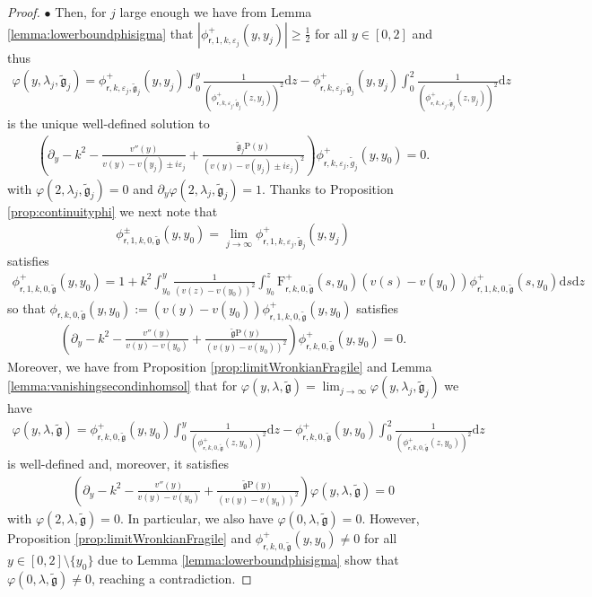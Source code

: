 \documentclass[11pt,reqno]{amsproc}
\newcommand{\bullsubpar}[1]{\vspace{.5em} $\bullet$ \normalfont {\bfseries #1.}}
\theoremstyle{definition}
\numberwithin{equation}{section}
\newcommand{\sr}{{\mathsf{r}}}
\renewcommand{\d}{\mathrm{d}}
\newcommand{\ep}{\varepsilon}
\newcommand{\g}{{\mathfrak{g}}}
\renewcommand{\P}{{\mathcal{P}}}
\begin{document}
\begin{proof}
\bullsubpar{Case $y_0 = \vartheta_n$ and $\P(y_j)>0$} Then, for $j$ large enough we have from Lemma \ref{lemma:lowerboundphisigma} that \newline $|\phi_{\sr,1,k,\ep_j}^+(y,y_j)|\geq \frac12$ for all $y\in [0,2]$ and thus
\begin{align*}
\varphi(y,\lambda_j,\tilde{\g}_j) = \phi_{\sr,k,\ep_j,\tilde{\g}_j}^+(y,y_j)\int_0^y \frac{1}{(\phi_{\sr,k,\ep_j,\tilde{\g}_j}^+(z,y_j))^2} \d z - \phi_{\sr,k,\ep_j,\tilde{\g}_j}^+(y,y_j) \int_0^2 \frac{1}{(\phi_{\sr,k,\ep_j,\tilde{\g}_j}^+(z,y_j))^2}\d z 
\end{align*}
is the unique well-defined solution to 
\begin{align*}
\left(\partial_y - k^2 - \frac{v''(y)}{v(y) - v(y_j)\pm i\ep_j} + \frac{\tilde{\g}_j\mathrm{P}(y)}{(v(y) - v(y_j)\pm i\ep_j)^2}\right) \phi_{\sr,k,\ep_j,\tilde{g}_j}^+(y,y_0) =0.
\end{align*}
 with $\varphi(2,\lambda_j,\tilde{\g}_j) = 0$ and $\partial_y\varphi(2,\lambda_j,\tilde{\g}_j)=1$. Thanks to Proposition \ref{prop:continuityphi} we next note that  
\begin{align*}
\phi_{\sr,1,k,0,\tilde{\g}}^\pm(y,y_0)=\lim_{j\rightarrow\infty} \phi_{\sr,1,k,\ep_j,\tilde{\g}_j}^+(y,y_j)
\end{align*}
satisfies
\begin{align*}
\phi_{\sr,1,k,0,\tilde{\g}}^+(y,y_0)= 1 + k^2\int_{y_0}^y \frac{1}{(v(z) - v(y_0))^2}\int_{y_0}^z \mathrm{F}_{\sr,k,0,\tilde{\g}}^+(s,y_0) (v(s) - v(y_0)) \phi_{\sr,1,k,0,\tilde{\g}}^+(s,y_0) \d s \d z
\end{align*}
so that $\phi_{\sr,k,0,\tilde{\g}}(y,y_0) := (v(y) - v(y_0)) \phi_{\sr,1,k,0,\tilde{\g}}^+(y,y_0)$ satisfies
\begin{align*}
\left(\partial_y - k^2 - \frac{v''(y)}{v(y) - v(y_0)} + \frac{\tilde{\g}\mathrm{P}(y)}{(v(y) - v(y_0))^2}\right) \phi_{\sr,k,0,\tilde{\g}}^+(y,y_0) =0.
\end{align*}
Moreover, we have from Proposition \ref{prop:limitWronkianFragile} and Lemma \ref{lemma:vanishingsecondinhomsol} that for $\varphi(y,\lambda,\tilde{\g}) = \lim_{j\rightarrow \infty} \varphi(y, \lambda_j, \tilde{\g}_j)$ we have
\begin{align*}
\varphi(y,\lambda,\tilde{\g}) =\phi_{\sr,k,0,\tilde{\g}}^+(y,y_0)\int_0^y \frac{1}{(\phi_{\sr,k,0,\tilde{\g}}^+(z,y_0))^2} \d z - \phi_{\sr,k,0,\tilde{\g}}^+(y,y_0) \int_0^2 \frac{1}{(\phi_{\sr,k,0,\tilde{\g}}^+(z,y_0))^2}\d z 
\end{align*}
is well-defined and, moreover, it satisfies
\begin{align*}
\left(\partial_y - k^2 - \frac{v''(y)}{v(y) - v(y_0)} + \frac{\tilde{\g}\mathrm{P}(y)}{(v(y) - v(y_0))^2}\right) \varphi(y,\lambda,\tilde{\g}) =0
\end{align*}
with $\varphi(2,\lambda,\tilde{\g})=0$. In particular, we also have $\varphi(0,\lambda,\tilde{\g})=0$. However, Proposition \ref{prop:limitWronkianFragile} and $\phi_{\sr,k,0,\tilde{\g}}^+(y,y_0)\neq 0$ for all $y\in[0,2]\setminus \lbrace y_0 \rbrace$ due to Lemma \ref{lemma:lowerboundphisigma} show that $\varphi(0,\lambda,\tilde\g)\neq 0$, reaching a contradiction. 


\end{proof}
\end{document}
